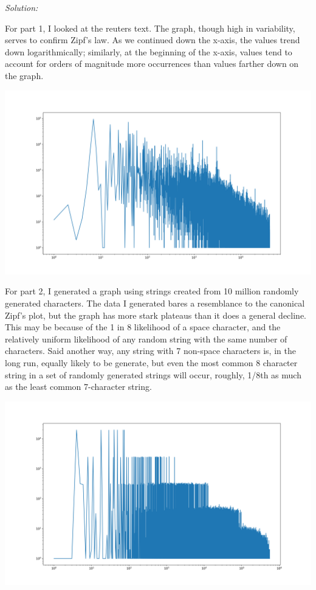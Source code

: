 \documentclass[11pt]{article}
\newenvironment{solution}{
	\vspace{10px}\noindent\emph{Solution:}
}{
	\vspace{10px}
}
\begin{document}
\begin{solution}
	
	For part 1, I looked at the reuters text. The graph, though high in variability, serves to confirm Zipf's law. As we continued down the x-axis, the values trend down logarithmically; similarly, at the beginning of the x-axis, values tend to account for orders of magnitude more occurrences than values farther down on the graph.
	
	\hspace*{-50pt}
	\includegraphics[width=550pt]{zipf_law_reuters.png}
	
	For part 2, I generated a graph using strings created from 10 million randomly generated characters. The data I generated bares a resemblance to the canonical Zipf's plot, but the graph has more stark plateaus than it does a general decline. This may be because of the 1 in 8 likelihood of a space character, and the relatively uniform likelihood of any random string with the same number of characters. Said another way, any string with 7 non-space characters is, in the long run, equally likely to be generate, but even the most common 8 character string in a set of randomly generated strings will occur, roughly, 1/8th as much as the least common 7-character string.  
	
	\hspace*{-50pt}
	\includegraphics[width=550pt]{zipf_plot_random.png}	
	

\end{solution}
\end{document}
